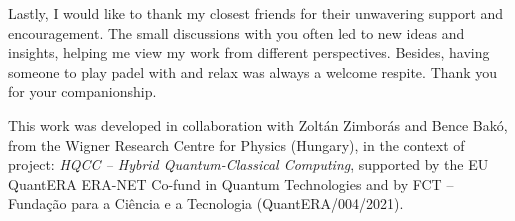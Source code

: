 Lastly, I would like to thank my closest friends for their unwavering support and encouragement. The small discussions with you often led to new ideas and insights, helping me view my work from different perspectives. Besides, having someone to play padel with and relax was always a welcome respite. Thank you for your companionship.

\vspace*{\fill}

This work was developed in collaboration with Zoltán Zimborás and Bence Bakó, from the Wigner Research Centre for Physics (Hungary), in the context of project: \textit{HQCC – Hybrid Quantum-Classical Computing}, supported by the EU QuantERA ERA-NET Co-fund in Quantum Technologies and by FCT -- Funda\c{c}\~{a}o para a Ci\^{e}ncia e a Tecnologia (QuantERA/004/2021).

